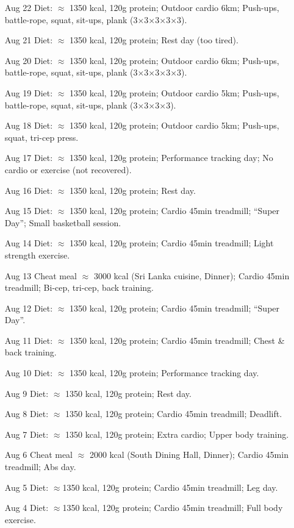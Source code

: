 \documentclass{article}
\begin{document}
\begin{itemize}
\item [Aug 22] Diet: $\approx$ 1350 kcal, 120g protein; Outdoor cardio 6km; Push-ups, battle-rope, squat, sit-ups, plank (3×3×3×3×3).
\item [Aug 21] Diet: $\approx$ 1350 kcal, 120g protein; Rest day (too tired). 
\item [Aug 20] Diet: $\approx$ 1350 kcal, 120g protein; Outdoor cardio 6km; Push-ups, battle-rope, squat, sit-ups, plank (3×3×3×3×3).
\item [Aug 19] Diet: $\approx$ 1350 kcal, 120g protein; Outdoor cardio 5km; Push-ups, battle-rope, squat, sit-ups, plank (3×3×3×3).
\item [Aug 18] Diet: $\approx$ 1350 kcal, 120g protein; Outdoor cardio 5km; Push-ups, squat, tri-cep press.
\item [Aug 17] Diet: $\approx$ 1350 kcal, 120g protein; Performance tracking day; No cardio or exercise (not recovered).
\item [Aug 16] Diet: $\approx$ 1350 kcal, 120g protein; Rest day.
\item [Aug 15] Diet: $\approx$ 1350 kcal, 120g protein; Cardio 45min treadmill; “Super Day”; Small basketball session.
\item [Aug 14] Diet: $\approx$ 1350 kcal, 120g protein; Cardio 45min treadmill; Light strength exercise.
\item [Aug 13] Cheat meal $\approx$ 3000 kcal (Sri Lanka cuisine, Dinner); Cardio 45min treadmill; Bi-cep, tri-cep, back training.
\item [Aug 12] Diet: $\approx$ 1350 kcal, 120g protein; Cardio 45min treadmill; “Super Day”.
\item [Aug 11] Diet: $\approx$ 1350 kcal, 120g protein; Cardio 45min treadmill; Chest \& back training.
\item [Aug 10] Diet: $\approx$ 1350 kcal, 120g protein; Performance tracking day.
\item [Aug 9] Diet: $\approx$ 1350 kcal, 120g protein; Rest day.
\item [Aug 8] Diet: $\approx$ 1350 kcal, 120g protein; Cardio 45min treadmill; Deadlift.
\item [Aug 7] Diet: $\approx$ 1350 kcal, 120g protein; Extra cardio; Upper body training.
\item [Aug 6] Cheat meal $\approx$ 2000 kcal (South Dining Hall, Dinner); Cardio 45min treadmill; Abs day.
\item [Aug 5] Diet: $\approx$1350 kcal, 120g protein; Cardio 45min treadmill; Leg day.
\item [Aug 4] Diet: $\approx$1350 kcal, 120g protein; Cardio 45min treadmill; Full body exercise.

\end{itemize}
\end{document}
